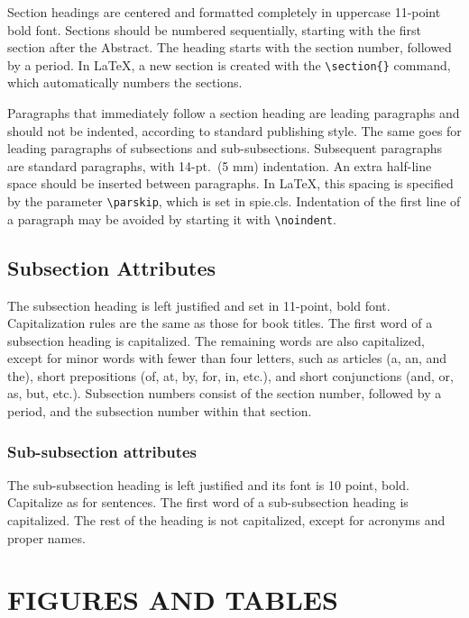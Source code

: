Section headings are centered and formatted completely in uppercase 11-point bold font.  Sections should be numbered sequentially, starting with the first section after the Abstract.  The heading starts with the section number, followed by a period.  In LaTeX, a new section is created with the \verb|\section{}| command, which automatically numbers the sections.

Paragraphs that immediately follow a section heading are leading paragraphs and should not be indented, according to standard publishing style\cite{Lamport94}.  The same goes for leading paragraphs of subsections and sub-subsections.  Subsequent paragraphs are standard paragraphs, with 14-pt.\ (5 mm) indentation.  An extra half-line space should be inserted between paragraphs.  In LaTeX, this spacing is specified by the parameter \verb|\parskip|, which is set in {\ttfamily spie.cls}.  Indentation of the first line of a paragraph may be avoided by starting it with \verb|\noindent|.

\subsection{Subsection Attributes}

The subsection heading is left justified and set in 11-point, bold font.  Capitalization rules are the same as those for book titles.  The first word of a subsection heading is capitalized.  The remaining words are also capitalized, except for minor words with fewer than four letters, such as articles (a, an, and the), short prepositions (of, at, by, for, in, etc.), and short conjunctions (and, or, as, but, etc.).  Subsection numbers consist of the section number, followed by a period, and the subsection number within that section.

\subsubsection{Sub-subsection attributes}
The sub-subsection heading is left justified and its font is 10 point, bold.  Capitalize as for sentences.  The first word of a sub-subsection heading is capitalized.  The rest of the heading is not capitalized, except for acronyms and proper names.

\section{FIGURES AND TABLES}

